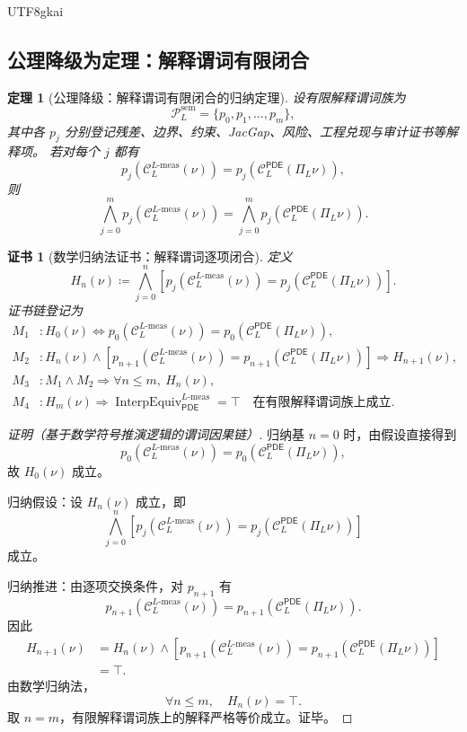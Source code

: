 \documentclass[12pt]{article}
\newtheorem{theorem}{定理}[section]
\newtheorem{Certificate}{证书}[section]
\newcommand{\DefEq}{\coloneqq}
\newcommand{\PDE}{\ensuremath{\mathsf{PDE}}}
\DeclareMathOperator{\InterpEquiv}{InterpEquiv}
\newcommand{\Lmeas}{L\text{-}\mathrm{meas}}
\begin{document}
\begin{CJK*}{UTF8}{gkai}
\subsection{公理降级为定理：解释谓词有限闭合}
\label{subsec:tex58-l-meaning-induction}

\begin{theorem}[公理降级：解释谓词有限闭合的归纳定理]
\label{thm:tex58-l-meaning-induction}
设有限解释谓词族为
\[
  \mathcal P_L^{\mathrm{sem}}
  =
  \{p_0,p_1,\dots,p_m\},
\]
其中各 \(p_j\) 分别登记残差、边界、约束、JacGap、风险、工程兑现与审计证书等解释项。
若对每个 \(j\) 都有
\[
  p_j\!\left(\mathcal C_L^{\Lmeas}(\nu)\right)
  =
  p_j\!\left(\mathcal C_L^{\PDE}(\Pi_L\nu)\right),
\]
则
\[
  \bigwedge_{j=0}^{m}
  p_j\!\left(\mathcal C_L^{\Lmeas}(\nu)\right)
  =
  \bigwedge_{j=0}^{m}
  p_j\!\left(\mathcal C_L^{\PDE}(\Pi_L\nu)\right).
\]
\end{theorem}

\begin{Certificate}[数学归纳法证书：解释谓词逐项闭合]
\label{cert:tex58-l-meaning-induction}
定义
\[
  H_n(\nu)
  \DefEq
  \bigwedge_{j=0}^{n}
  \left[
  p_j\!\left(\mathcal C_L^{\Lmeas}(\nu)\right)
  =
  p_j\!\left(\mathcal C_L^{\PDE}(\Pi_L\nu)\right)
  \right].
\]
证书链登记为
\[
\begin{aligned}
  M_1 &: H_0(\nu)
  \Longleftrightarrow
  p_0(\mathcal C_L^{\Lmeas}(\nu))
  =
  p_0(\mathcal C_L^{\PDE}(\Pi_L\nu)),\\
  M_2 &: H_n(\nu)\wedge
  \left[
  p_{n+1}(\mathcal C_L^{\Lmeas}(\nu))
  =
  p_{n+1}(\mathcal C_L^{\PDE}(\Pi_L\nu))
  \right]
  \Rightarrow
  H_{n+1}(\nu),\\
  M_3 &: M_1\wedge M_2
  \Rightarrow
  \forall n\le m,\ H_n(\nu),\\
  M_4 &: H_m(\nu)
  \Rightarrow
  \InterpEquiv_{\PDE}^{\Lmeas}=\top
  \quad\text{在有限解释谓词族上成立}.
\end{aligned}
\]
\end{Certificate}

\begin{proof}[证明（基于数学符号推演逻辑的谓词因果链）]
归纳基 \(n=0\) 时，由假设直接得到
\[
  p_0(\mathcal C_L^{\Lmeas}(\nu))
  =
  p_0(\mathcal C_L^{\PDE}(\Pi_L\nu)),
\]
故 \(H_0(\nu)\) 成立。

归纳假设：设 \(H_n(\nu)\) 成立，即
\[
  \bigwedge_{j=0}^{n}
  \left[
  p_j(\mathcal C_L^{\Lmeas}(\nu))
  =
  p_j(\mathcal C_L^{\PDE}(\Pi_L\nu))
  \right]
\]
成立。

归纳推进：由逐项交换条件，对 \(p_{n+1}\) 有
\[
  p_{n+1}(\mathcal C_L^{\Lmeas}(\nu))
  =
  p_{n+1}(\mathcal C_L^{\PDE}(\Pi_L\nu)).
\]
因此
\[
\begin{aligned}
  H_{n+1}(\nu)
  &=
  H_n(\nu)
  \wedge
  \left[
  p_{n+1}(\mathcal C_L^{\Lmeas}(\nu))
  =
  p_{n+1}(\mathcal C_L^{\PDE}(\Pi_L\nu))
  \right]\\
  &=\top.
\end{aligned}
\]
由数学归纳法，
\[
  \forall n\le m,\quad H_n(\nu)=\top.
\]
取 \(n=m\)，有限解释谓词族上的解释严格等价成立。证毕。
\end{proof}


\end{CJK*}
\end{document}
